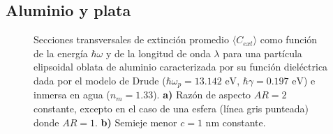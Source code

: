 \subsection*{Aluminio y plata}
\begin{figure}[h!]
	\quad%
	\caption{Secciones transversales de extinción promedio $\langle C_{ext}\rangle$ como función de la energía $\hbar\omega$ y de la longitud de onda $\lambda$ para una partícula elipsoidal oblata de aluminio caracterizada por su función dieléctrica dada por el modelo de Drude ($\hbar\omega_p=13.142\text{ eV}$, $\hbar\gamma=0.197\text{ eV}$) e inmersa en agua ($n_m=1.33$). \textbf{a)} Razón de aspecto $AR=2$ constante, excepto en el caso de una esfera (línea gris punteada) donde $AR=1$. \textbf{b)} Semieje menor $c=1$ nm constante.}\label{fig:test}
\end{figure}

